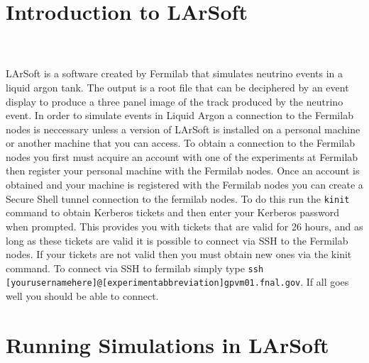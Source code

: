 \documentclass[svgnames]{report}
\begin{document}
\section*{Introduction to LArSoft}
         \\ \\
\indent LArSoft is a software created by Fermilab that simulates neutrino events in a liquid argon tank. The output is a root file that can be deciphered by an event display to produce a three panel image of the track produced by the neutrino event. In order to simulate events in Liquid Argon a connection to the Fermilab nodes is neccessary unless a version of LArSoft is installed on a personal machine or another machine that you can access. To obtain a connection to the Fermilab nodes you first must acquire an account with one of the experiments at Fermilab then register your personal machine with the Fermilab nodes.
\indent Once an account is obtained and your machine is registered with the Fermilab nodes you can create a Secure Shell tunnel connection to the fermilab nodes. To do this run the \texttt{kinit} command to obtain Kerberos tickets and then enter your Kerberos password when prompted. This provides you with tickets that are valid for 26 hours, and as long as these tickets are valid it is possible to connect via SSH to the Fermilab nodes. If your tickets are not valid then you must obtain new ones via the kinit command. To connect via SSH to fermilab simply type \texttt{ssh [yourusernamehere]@[experimentabbreviation]gpvm01.fnal.gov}. If all goes well you should be able to connect. \\

\section*{Running Simulations in LArSoft}
         \\ \\
\end{document}

